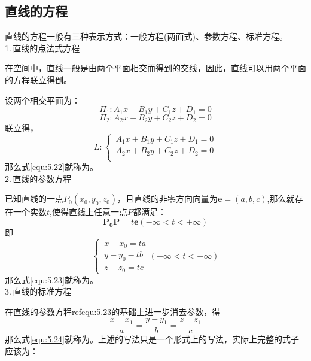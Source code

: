\subsection{直线的方程}
直线的方程一般有三种表示方式：一般方程(两面式)、参数方程、标准方程。\\
1.$\,$直线的点法式方程
\par 在空间中，直线一般是由两个平面相交而得到的交线，因此，直线可以用两个平面的方程联立得倒。
\par 设两个相交平面为：
\begin{equation}
	\nonumber
	\Pi_1:A_1x+B_1y+C_1z+D_1=0
\end{equation}
\begin{equation}
	\nonumber
\Pi_2: A_2x+B_2y+C_2z+D_2=0
\end{equation}
联立得，
\begin{equation}
	L:\begin{cases}
	\, A_1x+B_1y+C_1z+D_1=0\\
	\, 	A_2x+B_2y+C_2z+D_2=0\\
		\end{cases}
	\label{equ:5.22}
\end{equation}
那么式\ref{equ:5.22}就称为。
\\ 2.$\,$直线的参数方程
\par 已知直线的一点$P_0(x_0,y_0,z_0)$，且直线的非零方向向量为$\boldsymbol{e}=(a,b,c)$,那么就存在一个实数$t$,使得直线上任意一点$P$都满足：
\begin{equation}
	\boldsymbol{P_0P}=t\boldsymbol{e}(-\infty<t<+\infty)
\end{equation}
即
\begin{equation}
	\begin{cases}
		\, x-x_0=ta\\
		\, y-y_0-tb\\
		\, z-z_0=tc
	\end{cases}
(-\infty<t<+\infty)
\label{equ:5.23}
\end{equation}
那么式\ref{equ:5.23}就称为。
\\ 3.$\,$直线的标准方程
\par 在直线的参数方程ref{equ:5.23}的基础上进一步消去参数，得
\begin{equation}
	\frac{x-x_1}{a}=\frac{y-y_1}{b}=\frac{z-z_1}{c}
\label{equ:5.24}
\end{equation}
那么式\ref{equ:5.24}就称为。上述的写法只是一个形式上的写法，实际上完整的式子应该为：

